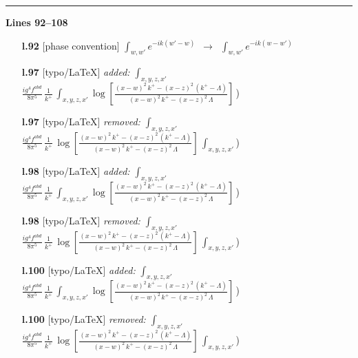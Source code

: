 \documentclass[10pt]{article}
\begin{document}
\noindent\rule{\linewidth}{0.3pt}\par\noindent\textbf{Lines 92--108} \par
\begin{itemize}[leftmargin=2.2em,itemsep=1pt,topsep=2pt]
\item[\textbf{l.92}] \textsf{\small [phase convention]} $\displaystyle \int_{w,w'}e^{-ik(w'-w)}$\ $\longrightarrow$\ $\displaystyle \int_{w,w'}e^{-ik(w-w')}$
\item[\textbf{l.97}] \textsf{\small [typo/LaTeX]} \emph{added:} $\displaystyle \int_{x,y,z,x'}$$\displaystyle \frac{ig^{4}f^{abd}}{8\pi^{5}}\,\frac{1}{k^{+}}\,\int_{x,y,z,x'}\log{[\frac{(x-w)^{2}\,k^{+}-(x-z)^{2}\,(k^{+}-\Lambda)}{(x-w)^{2}\,k^{+}-(x-z)^{2}\,\Lambda}]}\,${\color{gray}\small)}
\item[\textbf{l.97}] \textsf{\small [typo/LaTeX]} \emph{removed:} $\displaystyle \int_{x,y,z,x'}$$\displaystyle \frac{ig^{4}f^{abd}}{8\pi^{5}}\,\frac{1}{k^{+}}\,\log{[\frac{(x-w)^{2}\,k^{+}-(x-z)^{2}\,(k^{+}-\Lambda)}{(x-w)^{2}\,k^{+}-(x-z)^{2}\,\Lambda}]}\,\int_{x,y,z,x'}${\color{gray}\small)}
\item[\textbf{l.98}] \textsf{\small [typo/LaTeX]} \emph{added:} $\displaystyle \int_{x,y,z,x'}$$\displaystyle \frac{ig^{4}f^{abd}}{8\pi^{5}}\,\frac{1}{k^{+}}\,\int_{x,y,z,x'}\log{[\frac{(x-w)^{2}\,k^{+}-(x-z)^{2}\,(k^{+}-\Lambda)}{(x-w)^{2}\,k^{+}-(x-z)^{2}\,\Lambda}]}\,${\color{gray}\small)}
\item[\textbf{l.98}] \textsf{\small [typo/LaTeX]} \emph{removed:} $\displaystyle \int_{x,y,z,x'}$$\displaystyle \frac{ig^{4}f^{abd}}{8\pi^{5}}\,\frac{1}{k^{+}}\,\log{[\frac{(x-w)^{2}\,k^{+}-(x-z)^{2}\,(k^{+}-\Lambda)}{(x-w)^{2}\,k^{+}-(x-z)^{2}\,\Lambda}]}\,\int_{x,y,z,x'}${\color{gray}\small)}
\item[\textbf{l.100}] \textsf{\small [typo/LaTeX]} \emph{added:} $\displaystyle \int_{x,y,z,x'}$$\displaystyle \frac{ig^{4}f^{abd}}{8\pi^{5}}\,\frac{1}{k^{+}}\,\int_{x,y,z,x'}\log{[\frac{(x-w)^{2}\,k^{+}-(x-z)^{2}\,(k^{+}-\Lambda)}{(x-w)^{2}\,k^{+}-(x-z)^{2}\,\Lambda}]}\,${\color{gray}\small)}
\item[\textbf{l.100}] \textsf{\small [typo/LaTeX]} \emph{removed:} $\displaystyle \int_{x,y,z,x'}$$\displaystyle \frac{ig^{4}f^{abd}}{8\pi^{5}}\,\frac{1}{k^{+}}\,\log{[\frac{(x-w)^{2}\,k^{+}-(x-z)^{2}\,(k^{+}-\Lambda)}{(x-w)^{2}\,k^{+}-(x-z)^{2}\,\Lambda}]}\,\int_{x,y,z,x'}${\color{gray}\small)}

\end{itemize}
\end{document}
